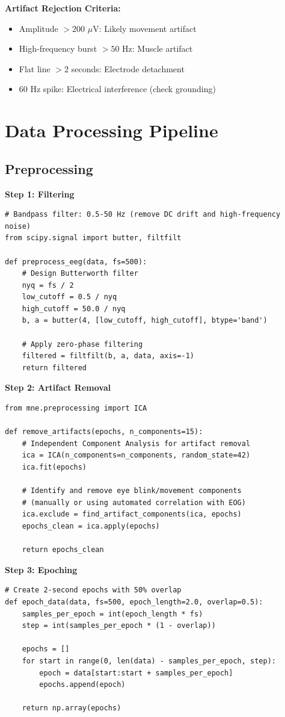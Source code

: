 \textbf{Artifact Rejection Criteria:}
\begin{itemize}
\item Amplitude $> 200$ $\mu$V: Likely movement artifact
\item High-frequency burst $> 50$ Hz: Muscle artifact
\item Flat line $> 2$ seconds: Electrode detachment
\item 60 Hz spike: Electrical interference (check grounding)
\end{itemize}

\section{Data Processing Pipeline}

\subsection{Preprocessing}

\textbf{Step 1: Filtering}
\begin{verbatim}
# Bandpass filter: 0.5-50 Hz (remove DC drift and high-frequency noise)
from scipy.signal import butter, filtfilt

def preprocess_eeg(data, fs=500):
    # Design Butterworth filter
    nyq = fs / 2
    low_cutoff = 0.5 / nyq
    high_cutoff = 50.0 / nyq
    b, a = butter(4, [low_cutoff, high_cutoff], btype='band')

    # Apply zero-phase filtering
    filtered = filtfilt(b, a, data, axis=-1)
    return filtered
\end{verbatim}

\textbf{Step 2: Artifact Removal}
\begin{verbatim}
from mne.preprocessing import ICA

def remove_artifacts(epochs, n_components=15):
    # Independent Component Analysis for artifact removal
    ica = ICA(n_components=n_components, random_state=42)
    ica.fit(epochs)

    # Identify and remove eye blink/movement components
    # (manually or using automated correlation with EOG)
    ica.exclude = find_artifact_components(ica, epochs)
    epochs_clean = ica.apply(epochs)

    return epochs_clean
\end{verbatim}

\textbf{Step 3: Epoching}
\begin{verbatim}
# Create 2-second epochs with 50% overlap
def epoch_data(data, fs=500, epoch_length=2.0, overlap=0.5):
    samples_per_epoch = int(epoch_length * fs)
    step = int(samples_per_epoch * (1 - overlap))

    epochs = []
    for start in range(0, len(data) - samples_per_epoch, step):
        epoch = data[start:start + samples_per_epoch]
        epochs.append(epoch)

    return np.array(epochs)
\end{verbatim}

